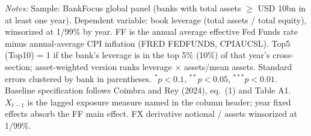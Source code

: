 \documentclass[11pt]{article}
\begin{document}
\begin{table}[htbp]
\begin{threeparttable}
\begin{tablenotes}[flushleft]
\item \textit{Notes:} Sample: BankFocus global panel (banks with total assets $\geq$ USD 10bn in at least one year). Dependent variable: book leverage (total assets / total equity), winsorized at 1/99\% by year. FF is the annual average effective Fed Funds rate minus annual-average CPI inflation (FRED FEDFUNDS, CPIAUCSL). Top5 (Top10) = 1 if the bank's leverage is in the top 5\% (10\%) of that year's cross-section; asset-weighted version ranks leverage $\times$ assets/mean assets. Standard errors clustered by bank in parentheses. $^{*}p<0.1$, $^{**}p<0.05$, $^{***}p<0.01$. Baseline specification follows Coimbra and Rey (2024), eq.~(1) and Table A1. $X_{t-1}$ is the lagged exposure measure named in the column header; year fixed effects absorb the FF main effect. FX derivative notional / assets winsorized at 1/99\%.
\end{tablenotes}
\end{threeparttable}
\end{table}
\end{document}
